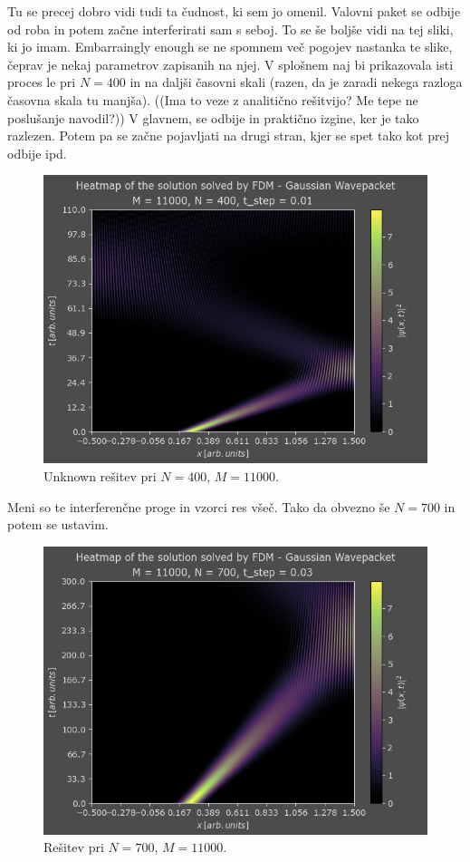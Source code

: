 \documentclass[a4paper]{article}
\begin{document}
Tu se precej dobro vidi tudi ta čudnost, ki sem jo omenil. Valovni paket se odbije od roba in potem
začne interferirati sam s seboj. To se še boljše vidi na tej sliki, ki jo imam. Embarraingly enough
se ne spomnem več pogojev nastanka te slike, čeprav je nekaj parametrov zapisanih na njej. V splošnem
naj bi prikazovala isti proces le pri $N=400$ in na daljši časovni skali (razen, da je zaradi nekega 
razloga časovna skala tu manjša). ((Ima to veze z analitično rešitvijo? Me tepe ne poslušanje navodil?))
V glavnem, se odbije in praktično izgine, ker je tako razlezen. Potem pa se začne pojavljati na drugi
stran, kjer se spet tako kot prej odbije ipd.

\begin{figure}[H]
    \centering
    \includegraphics[width=\textwidth]{./images/case2_N400.png}
    \caption{Unknown rešitev pri $N=400$, $M=11000$.}
\end{figure}

Meni so te interferenčne proge in vzorci res všeč. Tako da obvezno še $N=700$ in potem se ustavim. 

\begin{figure}[H]
    \centering
    \includegraphics[width=\textwidth]{./images/case2_N700.png}
    \caption{Rešitev pri $N=700$, $M=11000$.}
\end{figure}
\end{document}

